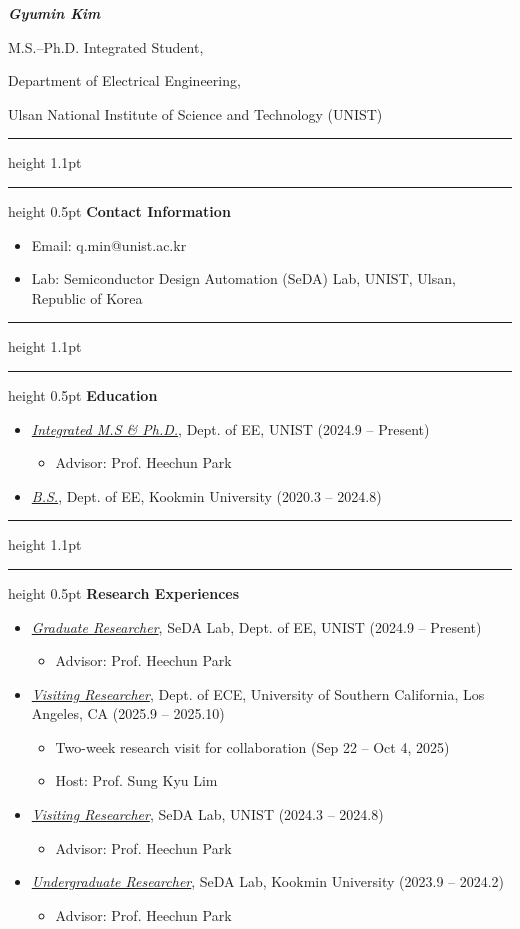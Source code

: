 \documentclass[11pt,a4paper]{article}
\newcommand{\doublerule}{%
  \par\vspace{8pt}%
  \hrule height 1.1pt\vspace{1.6pt}\hrule height 0.5pt%
  \vspace{3pt}}
\newcommand{\sect}[1]{\doublerule\textbf{#1}\par\vspace{1pt}}
\newcommand{\role}[1]{\uline{\textit{#1}}}
\begin{document}
{\large\bfseries\itshape
Gyumin Kim\par\vspace{7pt}
M.S.--Ph.D. Integrated Student,\par\vspace{7pt}
Department of Electrical Engineering,\par\vspace{7pt}
Ulsan National Institute of Science and Technology (UNIST)\par}

\sect{Contact Information}
\begin{itemize}
  \item Email: q.min@unist.ac.kr
  \item Lab: Semiconductor Design Automation (SeDA) Lab, UNIST, Ulsan, Republic of Korea
\end{itemize}

\sect{Education}
\begin{itemize}
  \item \role{Integrated M.S \& Ph.D.}, Dept. of EE, UNIST (2024.9 -- Present)
  \begin{itemize}
    \item Advisor: Prof. Heechun Park
  \end{itemize}
  \item \role{B.S.}, Dept. of EE, Kookmin University (2020.3 -- 2024.8)
\end{itemize}

\sect{Research Experiences}
\begin{itemize}
  \item \role{Graduate Researcher}, SeDA Lab, Dept. of EE, UNIST (2024.9 -- Present)
  \begin{itemize}
    \item Advisor: Prof. Heechun Park
  \end{itemize}
  \item \role{Visiting Researcher}, Dept. of ECE, University of Southern California, Los Angeles, CA (2025.9 -- 2025.10)
  \begin{itemize}
    \item Two-week research visit for collaboration (Sep 22 -- Oct 4, 2025)
    \item Host: Prof. Sung Kyu Lim
  \end{itemize}
  \item \role{Visiting Researcher}, SeDA Lab, UNIST (2024.3 -- 2024.8)
  \begin{itemize}
    \item Advisor: Prof. Heechun Park
  \end{itemize}
  \item \role{Undergraduate Researcher}, SeDA Lab, Kookmin University (2023.9 -- 2024.2)
  \begin{itemize}
    \item Advisor: Prof. Heechun Park
  \end{itemize}
\end{itemize}
\end{document}
